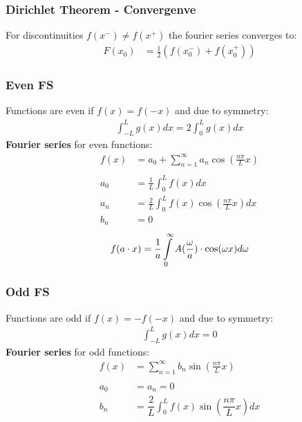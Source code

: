 \subsubsection{Dirichlet Theorem - Convergenve}
For discontinuities $f(x^-)\neq f(x^+)$ the fourier series converges to:
\begin{align*}
    F(x_0) & =\frac12(f(x_0^-)+f(x_0^+))
\end{align*}

\subsubsection{Even FS}
Functions are even if $f(x)=f(-x)$ and due to symmetry:
\begin{align*}
    \int_{-L}^{L}g(x)dx=2\int_0^{L}g(x)dx
\end{align*}
\textbf{Fourier series} for even functions:
\begin{align*}
    f(x)  & =a_0+\sum_{n=1}^{\infty}a_n\cos\left(\frac{n\pi}{L}x\right) \\ \\
    a_{0} & =\frac{1}{L}\int_{0}^{L}f(x)dx                              \\
    a_{n} & =\frac2L\int_0^{L}f(x)\cos\left(\frac{n\pi}Lx\right)dx      \\
    b_{n} & =0
\end{align*}
\begin{align*}
    f(a\cdot x)=\frac1a\intop_0^\infty A(\frac\omega a)\cdot \cos(\omega x)d\omega
\end{align*}
\subsubsection{Odd FS}
Functions are odd if $f(x)=-f(-x)$ and due to symmetry:
\begin{align*}
    \int_{-L}^L g(x)dx=0
\end{align*}
\textbf{Fourier series} for odd functions:
\begin{align*}
    f(x) & =\sum_{n=1}^\infty b_n\sin\left(\frac{n\pi}Lx\right)          \\ \\
    a_0  & = a_n = 0                                                     \\
    b_n  & =\dfrac{2}{L}\int_0^L f(x)\sin\left(\dfrac{n\pi}{L}x\right)dx
\end{align*}

